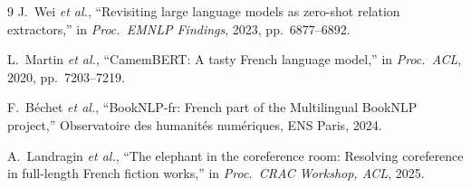 \documentclass[a4paper]{article}
\begin{document}
\begin{thebibliography}{9}
J.\ Wei \textit{et al.},
``Revisiting large language models as zero-shot relation extractors,''
in \textit{Proc.\ EMNLP Findings}, 2023, pp.~6877--6892.

L.\ Martin \textit{et al.},
``CamemBERT: A tasty French language model,''
in \textit{Proc.\ ACL}, 2020, pp.~7203--7219.

F.\ Béchet \textit{et al.},
``BookNLP-fr: French part of the Multilingual BookNLP project,''
Observatoire des humanités numériques, ENS Paris, 2024.

A.\ Landragin \textit{et al.},
``The elephant in the coreference room: Resolving coreference in
full-length French fiction works,''
in \textit{Proc.\ CRAC Workshop, ACL}, 2025.

\end{thebibliography}
\end{document}
